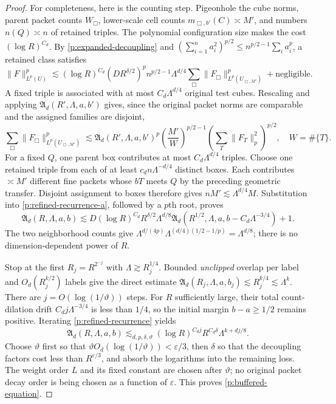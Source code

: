 \begin{proof}
For completeness, here is the counting step.  Pigeonhole the cube norms,
parent packet counts $W_\Box$, lower-scale cell counts
$m_{\Box,b'}(C)\asymp M'$, and numbers $n(Q)\asymp n$ of retained triples.
The polynomial configuration size makes the cost $(\log R)^{C_d}$.
By \eqref{p:expanded-decoupling} and
$(\sum_{i=1}^n a_i^2)^{p/2}\leq n^{p/2-1}\sum_i a_i^p$, a retained class
satisfies
\begin{equation}\label{p:refined-recurrence-a}
 \|F\|_{L^p(U)}^p\lesssim
 (\log R)^{C_d}(DR^{\delta/2})^p
 n^{p/2-1}\Lambda^{d/4}
 \sum_\Box\|F_\Box\|_{L^p(U_{\Box,M'})}^p
 +\text{negligible}.
\end{equation}
A fixed triple is associated with at most $C_d\Lambda^{d/4}$ original
test cubes.  Rescaling and applying $\mathfrak A_d(R',\Lambda,a,b')$
gives, since the original packet norms are comparable and the assigned
families are disjoint,
\[
 \sum_\Box\|F_\Box\|_{L^p(U_{\Box,M'})}^p
 \lesssim\mathfrak A_d(R',\Lambda,a,b')^p
 \left(\frac{M'}W\right)^{p/2-1}
 \left(\sum_T\|F_T\|_p^2\right)^{p/2},\quad W=\#\{T\}.
\]
For a fixed $Q$, one parent box contributes at most
$C_d\Lambda^{d/4}$ triples.  Choose one retained triple from each of at
least $c_dn\Lambda^{-d/4}$ distinct boxes.  Each contributes $\asymp M'$
different fine packets whose $bT$ meets $Q$ by the preceding geometric
transfer.  Disjoint assignment to boxes therefore gives
$nM'\lesssim\Lambda^{d/4}M$.  Substitution into
\eqref{p:refined-recurrence-a}, followed by a $p$th root, proves
\begin{equation}\label{p:refined-recurrence}
 \mathfrak A_d(R,\Lambda,a,b)
 \lesssim D(\log R)^{C_d}R^{\delta/2}\Lambda^{d/8}
 \mathfrak A_d(R^{1/2},\Lambda,a,b-C_d\Lambda^{-3/4})+1.
\end{equation}
The two neighborhood counts give
$\Lambda^{d/(4p)}\Lambda^{(d/4)(1/2-1/p)}=\Lambda^{d/8}$;
there is no dimension-dependent power of $R$.

Stop at the first $R_j=R^{2^{-j}}$ with
$\Lambda\gtrsim R_j^{1/4}$.  Bounded \emph{unclipped} overlap per label
and $O_d(R_j^{k/2})$ labels give the direct estimate
$\mathfrak A_d(R_j,\Lambda,a,b_j)\lesssim R_j^{k/4}
\lesssim\Lambda^k$.  There are $j=O(\log(1/\vartheta))$ steps.  For
$R$ sufficiently large, their total count-dilation drift
$C_dj\Lambda^{-3/4}$ is less than $1/4$, so the initial margin
$b-a\geq1/2$ remains positive.  Iterating
\eqref{p:refined-recurrence} yields
\[
 \mathfrak A_d(R,\Lambda,a,b)
 \lesssim_{d,p,\delta,\vartheta}
 (\log R)^{C_dj}R^{C_d\delta}
 \Lambda^{k+dj/8}.
\]
Choose $\vartheta$ first so that
$\vartheta O_d(\log(1/\vartheta))<\varepsilon/3$, then $\delta$ so that
the decoupling factors cost less than $R^{\varepsilon/3}$, and absorb the
logarithms into the remaining loss.  The weight order $L$ and its fixed
constant are chosen after $\vartheta$; no original packet decay order is
being chosen as a function of $\varepsilon$.  This proves
\eqref{p:buffered-equation}.
\end{proof}


